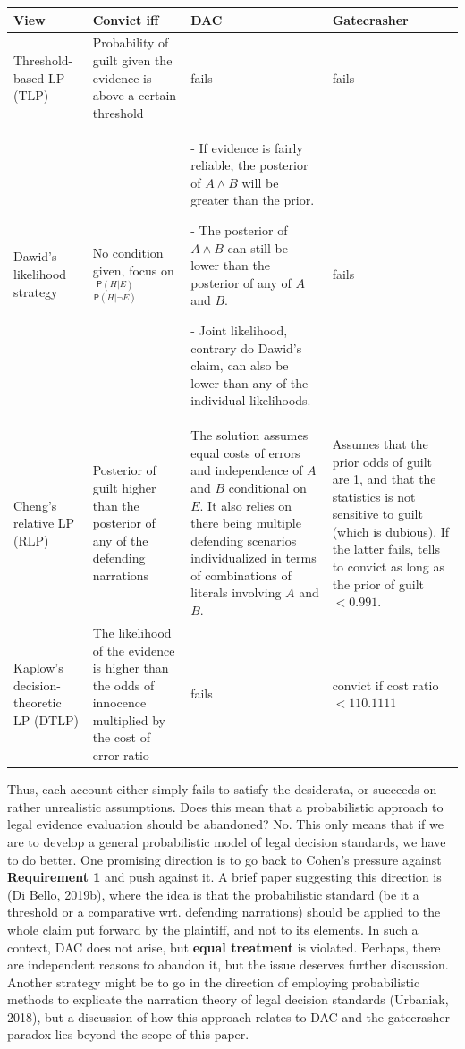 \documentclass[10pt,dvipsnames,enabledeprecatedfontcommands]{scrartcl}
\newcommand{\n}{\neg}
\newcommand{\et}{\wedge}
\newcommand{\pr}[1]{\mathsf{P}(#1)}
\begin{document}
\begin{center}
\footnotesize 
 \begin{tabular}{@{}p{3cm}p{2.5cm}p{4cm}p{3cm}@{}}
\toprule
\textbf{View} & \textbf{Convict iff} & \textbf{DAC} & \textbf{Gatecrasher} \\ \midrule
Threshold-based LP (TLP) & Probability of guilt given the evidence is above a certain threshold & fails & fails \\
Dawid's likelihood strategy & No condition given, focus on $\frac{\pr{H\vert E}}{\pr{H\vert \n E}}$ & - If evidence is fairly reliable, the posterior of $A\et B$ will be greater than the prior.

- The posterior of $A\et B$ can still be lower than the posterior of any of $A$ and $B$.

- Joint likelihood, contrary do Dawid's claim, can also be lower than any of the individual likelihoods. & fails  \\
Cheng's relative LP (RLP)
& Posterior of guilt higher than the posterior of any of the defending narrations & The solution assumes equal costs of errors and independence of $A$ and $B$ conditional on $E$. It also relies on there being multiple defending scenarios individualized in terms of  combinations of literals involving $A$ and $B$. & Assumes that the prior odds of guilt are 1, and that the statistics is not sensitive to guilt (which is dubious). If the latter fails, tells to convict as long as the prior of guilt $<0.991$. \\
Kaplow's decision-theoretic LP (DTLP) &
The likelihood of the evidence is higher than the odds of innocence multiplied by the cost of error ratio & fails & convict if cost ratio $<110.1111$
\end{tabular} 
 \end{center}

Thus, each account either simply fails to satisfy the desiderata, or
succeeds on rather unrealistic assumptions. Does this mean that a
probabilistic approach to legal evidence evaluation should be abandoned?
No. This only means that if we are to develop a general probabilistic
model of legal decision standards, we have to do better. One promising
direction is to go back to Cohen's pressure against
\textbf{Requirement 1} and push against it. A brief paper suggesting
this direction is (Di Bello, 2019b), where the idea is that the
probabilistic standard (be it a threshold or a comparative wrt.
defending narrations) should be applied to the whole claim put forward
by the plaintiff, and not to its elements. In such a context, DAC does
not arise, but \textbf{equal treatment} is violated. Perhaps, there are
independent reasons to abandon it, but the issue deserves further
discussion. Another strategy might be to go in the direction of
employing probabilistic methods to explicate the narration theory of
legal decision standards (Urbaniak, 2018), but a discussion of how this
approach relates to DAC and the gatecrasher paradox lies beyond the
scope of this paper.
\end{document}

